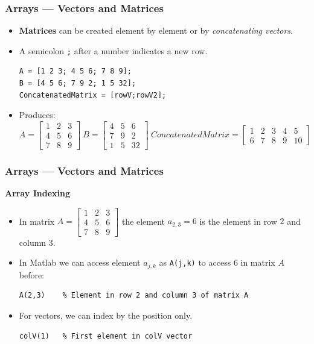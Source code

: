 \documentclass[11pt,xcolor={svgnames},aspectratio=169,usepdftitle=false,notheorems]{beamer}
\begin{document}
\begin{frame}[fragile]
    \frametitle{Arrays --- Vectors and Matrices}
\begin{itemize}
    \item \alert{\textbf{Matrices}} can be created element by element or by \textit{concatenating vectors}.
    \item A semicolon \verb+;+ after a number indicates a new row.
\begin{lstlisting}
A = [1 2 3; 4 5 6; 7 8 9];
B = [4 5 6; 7 9 2; 1 5 32];
ConcatenatedMatrix = [rowV;rowV2];
\end{lstlisting}
    \item Produces:
    \[
    A = \begin{bmatrix}
    1 & 2 & 3 \\
    4 & 5 & 6 \\
    7 & 8 & 9 
    \end{bmatrix} \ 
    B = \begin{bmatrix}
    4 & 5 & 6 \\
    7 & 9 & 2 \\
    1 & 5 & 32
    \end{bmatrix} \ 
    ConcatenatedMatrix = \begin{bmatrix}
    1 & 2 & 3 & 4 & 5 \\
    6 & 7 & 8 & 9 & 10
    \end{bmatrix}
    \]
\end{itemize}
\end{frame}

\begin{frame}[fragile]
    \frametitle{Arrays --- Vectors and Matrices}
\alert{\textbf{Array Indexing}}
    \begin{itemize}
        \item In matrix $A = \begin{bmatrix}
            1 & 2 & 3 \\
            4 & 5 & 6 \\
            7 & 8 & 9 
            \end{bmatrix}$ the element $a_{2,3} = 6$ is the element in row $2$ and column $3$.
        \item In Matlab we can access element $a_{j,k}$ as \verb;A(j,k); to access $6$ in matrix $A$ before:
\begin{lstlisting}
A(2,3)    % Element in row 2 and column 3 of matrix A
\end{lstlisting}
        \item For vectors, we can index by the position only.
\begin{lstlisting}
colV(1)   % First element in colV vector
\end{lstlisting}
    \end{itemize}
\end{frame}
\end{document}
